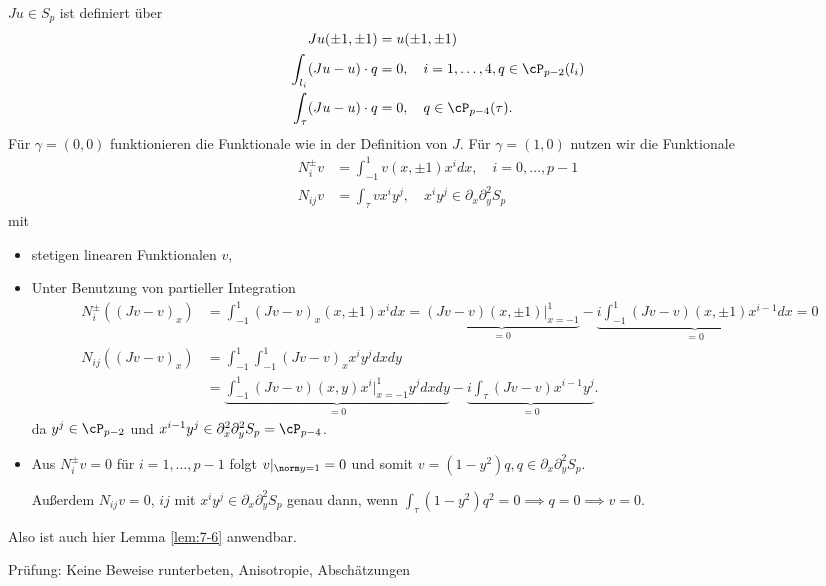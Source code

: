 $Ju \in S_{p}$ ist definiert über
\begin{align*}
  Ju (\pm 1, \pm 1) &= u(\pm 1, \pm 1)\\
\int_{l_{i}} (Ju- u)\cdot q &= 0, \quad i =1, \dots, 4, q \in \cP_{p-2}(l_{i})\\
\int_{\tau}(Ju - u)\cdot q &= 0, \quad q \in \cP_{p-4}(\tau). 
\end{align*}
Für $\gamma = (0, 0)$ funktionieren die Funktionale wie in der Definition von $J$. Für $\gamma = (1, 0)$ nutzen wir die Funktionale 
\begin{align*}
  N_{i}^{\pm} v &= \int_{-1}^{1} v(x, \pm 1)x^{i} dx , \quad i = 0, \dots, p-1\\
  N_{ij} v &= \int_{\tau} vx^{i}y^{j}, \quad x^{i}y^{j} \in \partial_{x} \partial^{2}_{y} S_{p} 
\end{align*}
mit
\begin{itemize}
\item stetigen linearen Funktionalen $v$, 
\item Unter Benutzung von partieller Integration
  \begin{align*}
      N_{i}^{\pm} ((Jv-v)_{x}) &= \int_{-1}^{1} (Jv - v)_{x} (x, \pm 1)x^{i} dx = \underbrace{(Jv- v)(x, \pm 1)|_{x = -1}^{1}}_{=0} - \underbrace{i \int_{-1}^{1} (Jv - v)(x, \pm1)x^{i-1} dx}_{=0} = 0\\
  N_{ij} ((Jv-v)_{x}) &= \int_{-1}^{1}\int_{-1}^{1}(Jv - v)_{x}x^{i}y^{j} dxdy \\
&=\underbrace{\int_{-1}^{1} (Jv - v)(x, y)x^{i}|_{x = -1}^{1} y^{j} dxdy}_{=0} - \underbrace {i \int_{\tau} (Jv - v)x^{i-1}y^{j}}_{=0}. 
  \end{align*}
da $y^{j}\in \cP_{p-2}$ und $x^{i-1}y^{j} \in \partial_{x}^{2} \partial_{y}^{2} S_{p} = \cP_{p-4}$.  
\item Aus $N_{i}^{\pm}v = 0$ für $i = 1, \dots, p-1$ folgt $v|_{\norm y = 1} = 0$ und somit $v = (1 - y^{2})q, q \in \partial_{x} \partial_{y}^{2} S_{p}$. 

Außerdem $N_{ij}v = 0$, $ij$ mit $x^{i}y^{j} \in\partial_{x} \partial_{y}^{2} S_{p}$ genau dann, wenn $\int_{\tau} (1 - y^{2})q^{2} = 0 \implies q = 0 \implies v = 0. $
\end{itemize}
Also ist auch hier Lemma \ref{lem:7-6} anwendbar.


Prüfung: Keine Beweise runterbeten, Anisotropie, Abschätzungen

